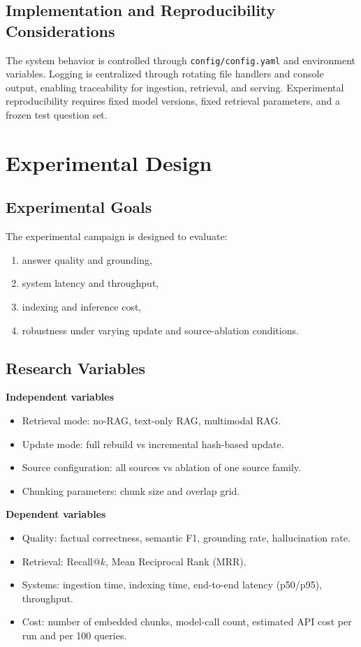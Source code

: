 \documentclass[11pt,a4paper]{article}
\begin{document}
\subsection{Implementation and Reproducibility Considerations}

The system behavior is controlled through \texttt{config/config.yaml} and environment variables. Logging is centralized through rotating file handlers and console output, enabling traceability for ingestion, retrieval, and serving. Experimental reproducibility requires fixed model versions, fixed retrieval parameters, and a frozen test question set.

\section{Experimental Design}

\subsection{Experimental Goals}

The experimental campaign is designed to evaluate:
\begin{enumerate}[leftmargin=1.2cm]
	\item answer quality and grounding,
	\item system latency and throughput,
	\item indexing and inference cost,
	\item robustness under varying update and source-ablation conditions.
\end{enumerate}

\subsection{Research Variables}

\textbf{Independent variables}
\begin{itemize}[leftmargin=1.2cm]
	\item Retrieval mode: no-RAG, text-only RAG, multimodal RAG.
	\item Update mode: full rebuild vs incremental hash-based update.
	\item Source configuration: all sources vs ablation of one source family.
	\item Chunking parameters: chunk size and overlap grid.
\end{itemize}

\textbf{Dependent variables}
\begin{itemize}[leftmargin=1.2cm]
	\item Quality: factual correctness, semantic F1, grounding rate, hallucination rate.
	\item Retrieval: Recall@$k$, Mean Reciprocal Rank (MRR).
	\item Systems: ingestion time, indexing time, end-to-end latency (p50/p95), throughput.
	\item Cost: number of embedded chunks, model-call count, estimated API cost per run and per 100 queries.
\end{itemize}
\end{document}
